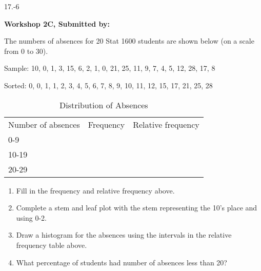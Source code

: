 \begin{exsol@exercise}{17.-6}
    \begin{center}
\begin{flushleft}\textbf{\large \hfill Workshop 2C, Submitted by: }\end{flushleft}

\end{center}

The numbers of absences for 20 Stat 1600 students are shown below (on a scale from 0 to 30).

Sample:	10, 0, 1, 3, 15, 6, 2, 1, 0, 21, 25, 11, 9, 7, 4, 5, 12, 28, 17, 8

Sorted:	0, 0, 1, 1, 2, 3, 4, 5, 6, 7, 8, 9, 10, 11, 12, 15, 17, 21, 25, 28


\begin{table}[ht]
\centering
\caption{Distribution of Absences}
\begin{tabular}{@{} lcc @{}} \hline
Number of absences & Frequency & Relative frequency \\
0-9 & & \\
10-19 & & \\
20-29 & & \\ \hline
\end{tabular}
\end{table}

\begin{enumerate}
  \item	Fill in the frequency and relative frequency above.
  \item	Complete a stem and leaf plot with the stem representing the 10's place and using 0-2.
  \item	Draw a histogram for the absences using the intervals in the relative frequency table above.
  \item	What percentage of students had number of absences less than 20?
\end{enumerate}

\end{exsol@exercise}
